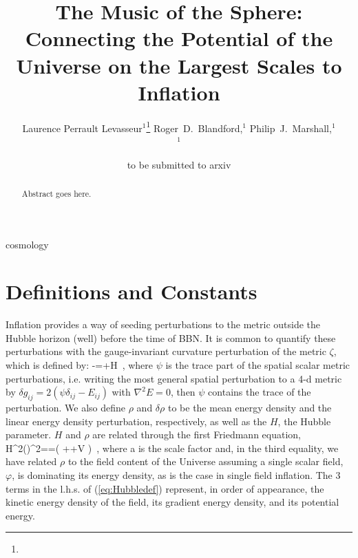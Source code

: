\documentclass[useAMS,usenatbib,a4paper,onecolumn]{mn2e}
\title[Inflation from the 3D Potential of the Universe]
{The Music of the Sphere: Connecting the Potential of the Universe on the Largest Scales to Inflation}
\author[Levasseur et al.]{%
    Laurence Perrault Levasseur$^{1}$\thanks{\lplemail}
    Roger~D.~Blandford,$^{1}$
    Philip~J.~Marshall,$^{1}$
    \medskip\\
    $^1$\kipac
}
\begin{document}
\date{to be submitted to arxiv}
\pagerange{\pageref{firstpage}--\pageref{lastpage}}

\maketitle

\label{firstpage}


\begin{abstract}

Abstract goes here.

\end{abstract}


\begin{keywords}
  cosmology
\end{keywords}

\setcounter{footnote}{1}



\section{Definitions and Constants}

Inflation provides a way of seeding perturbations to the metric outside the Hubble horizon (well) before the time of BBN. It is common to quantify these perturbations with the gauge-invariant curvature perturbation of the metric $\zeta$, which is defined by:
\be
	-\zeta=\psi+H\frac{\delta\rho}{\rho}\, ,
\ee
where $\psi$ is the trace part of the spatial scalar metric perturbations, i.e. writing the most general spatial perturbation to a 4-d metric by $\delta g_{ij}=2(\psi\delta_{ij}-E_{ij})$ with $\nabla^2E=0$, then $\psi$ contains the trace of the perturbation. We also define $\rho$ and $\delta \rho$ to be the mean energy density and the linear energy density perturbation, respectively, as well as the $H$, the Hubble parameter. $H$ and $\rho$ are related through the first Friedmann equation,
\be
\label{eq:Hubbledef}
	H^2\equiv \left(\right)^2=\rho=\left( ++V \right)\, ,
\ee
 where a is the scale factor and, in the third equality, we have related $\rho$ to the field content of the Universe assuming a single scalar field, $\varphi$, is dominating its energy density, as is the case in single field inflation. The 3 terms in the l.h.s. of (\ref{eq:Hubbledef}) represent, in order of appearance, the kinetic energy density of the field, its gradient energy density, and its potential energy.
\end{document}
